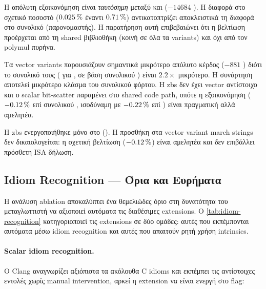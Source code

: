 Η απόλυτη εξοικονόμηση είναι \emph{ταυτόσημη} μεταξύ 
και  ($-\num{14684}$ \instret). Η διαφορά στο σχετικό
ποσοστό ($\SI{0.025}{\percent}$ έναντι $\SI{0.71}{\percent}$) αντικατοπτρίζει αποκλειστικά
τη διαφορά στο συνολικό \instret (παρονομαστής). Η παρατήρηση αυτή
επιβεβαιώνει ότι η βελτίωση προέρχεται από τη shared 
βιβλιοθήκη (κοινή σε όλα τα variants) και όχι από τον polymul πυρήνα.

Τα vector variants παρουσιάζουν σημαντικά μικρότερο απόλυτο κέρδος
($-\num{881}$ \instret) διότι το συνολικό τους \instret
( για , σε βάση συνολικού \KEM) είναι $2.2\times$ μικρότερο.
Η συνάρτηση  αποτελεί μικρότερο
κλάσμα του συνολικού φόρτου. Η \gls{zbs} δεν έχει vector αντίστοιχο και
ο scalar bit-scatter παραμένει στο shared code path, οπότε η εξοικονόμηση
($-\SI{0.12}{\percent}$ επί συνολικού \KEM, ισοδύναμη με $-\SI{0.22}{\percent}$ επί \Decaps) είναι πραγματική αλλά αμελητέα.

Η \gls{zbs} ενεργοποιήθηκε μόνο στο 
(). Η προσθήκη στα vector variant march
strings δεν δικαιολογείται: η σχετική βελτίωση ($-\SI{0.12}{\percent}$) είναι
αμελητέα και δεν επιβάλλει πρόσθετη ISA δήλωση.

\subsection{Idiom Recognition — Όρια και Ευρήματα}
\label{ssec:ablation-idiom-recognition}

Η ανάλυση ablation αποκαλύπτει ένα θεμελιώδες όριο στη δυνατότητα του
μεταγλωττιστή να αξιοποιεί αυτόματα τις διαθέσιμες extensions. Ο
\cref{tab:idiom-recognition} κατηγοριοποιεί τις extensions σε δύο ομάδες:
αυτές που εκπέμπονται αυτόματα μέσω idiom recognition
και αυτές που απαιτούν ρητή χρήση intrinsics.

\begin{table}[htbp]
  \centering
  \caption{Όριο idiom recognition: ο μεταγλωττιστής (Clang~21.1.1, )
    αναγνωρίζει αυτόματα scalar idioms αλλά δεν συνθέτει vector crypto
    primitives από generic C. Η στήλη  δηλώνει εάν η εντολή
    εκπέμπεται χωρίς ρητή παρέμβαση του προγραμματιστή.}
  \label{tab:idiom-recognition}
  \small
  
\end{table}

\paragraph{Scalar idiom recognition.}
Ο Clang αναγνωρίζει αξιόπιστα τα ακόλουθα C idioms και εκπέμπει τις
αντίστοιχες εντολές χωρίς manual intervention, αρκεί η extension να
είναι ενεργή στο  flag:

